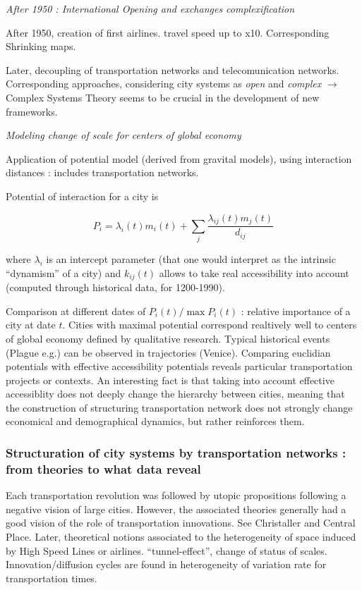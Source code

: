 \textit{After 1950 : International Opening and exchanges complexification}

After 1950, creation of first airlines. travel speed up to x10. Corresponding Shrinking maps.

Later, decoupling of transportation networks and telecomunication networks. Corresponding approaches, considering city systems as \emph{open} and \emph{complex} $\rightarrow$ Complex Systems Theory seems to be crucial in the development of new frameworks.

\bigskip
\textit{Modeling change of scale for centers of global economy}  

Application of potential model (derived from gravital models), using interaction distances : includes transportation networks.

Potential of interaction for a city is

\[
P_i = \lambda_i(t) m_i(t) + \sum_{j}{\frac{\lambda_{ij}(t)m_j(t)}{d_{ij}}}
\]

where $\lambda_i$ is an intercept parameter (that one would interpret as the intrinsic ``dynamism'' of a city) and $k_{ij}(t)$ allows to take real accessibility into account (computed through historical data, for 1200-1990).

Comparison at different dates of $P_i(t)/\max{P_i(t)}$ : relative importance of a city at date $t$. Cities with maximal potential correspond realtively well to centers of global economy defined by qualitative research. Typical historical events (Plague e.g.) can be observed in trajectories (Venice). Comparing euclidian potentials with effective accessibility potentials reveals particular transportation projects or contexts. An interesting fact is that taking into account effective accessiblity does not deeply change the hierarchy between cities, meaning that the construction of structuring transportation network does not strongly change economical and demographical dynamics, but rather reinforces them.


\subsubsection{Structuration of city systems by transportation networks : from theories to what data reveal}

Each transportation revolution was followed by utopic propositions following a negative vision of large cities. However, the associated theories generally had a good vision of the role of transportation innovations. See Christaller and Central Place. Later, theoretical notions associated to the heterogeneity of space induced by High Speed Lines or airlines. ``tunnel-effect'', change of status of scales. Innovation/diffusion cycles are found in heterogeneity of variation rate for transportation times.

